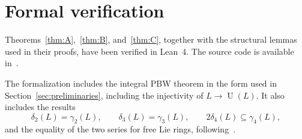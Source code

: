 \documentclass[a4paper,11pt,reqno]{amsart}
\theoremstyle{definition}
\newcommand{\U}{\operatorname U}
\begin{document}
\section{Formal verification}\label{sec:formalization}

Theorems~\ref{thm:A},~\ref{thm:B}, and~\ref{thm:C}, together with the
structural lemmas used in their proofs, have been verified in Lean~4.  The
source code is available in~\cite{IoninPetrovLean2026}.

The formalization includes the integral PBW theorem in the form used in
Section~\ref{sec:preliminaries}, including the injectivity of
$L\to\U(L)$.  It also includes the results
\[
 \delta_2(L)=\gamma_2(L),
 \qquad
 \delta_3(L)=\gamma_3(L),
 \qquad
 2\delta_4(L)\subseteq\gamma_4(L),
\]
and the equality of the two series for free Lie rings,
following~\cite{BartholdiPassi2015}.



\end{document}
